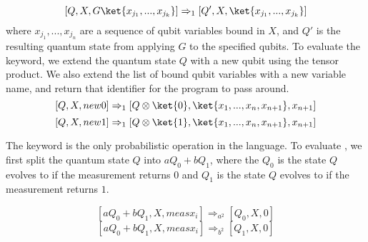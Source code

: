 \[ 
    [Q,X, G \ket{x_{j_1},...,x_{j_k}}] \Rightarrow_{1} [Q',X, \ket{x_{j_1},...,x_{j_k}}]
\]
where $x_{j_1},...,x_{j_n}$ are a sequence of qubit variables bound in $X$, and $Q'$ is the resulting quantum state from applying $G$ to the specified qubits.
To evaluate the  keyword, we extend the quantum state $Q$ with a new qubit using the tensor product.
We also extend the list of bound qubit variables with a new variable name, and return that identifier for the program to pass around.
\[
    [Q,X, new 0] \Rightarrow_1 [Q \otimes \ket{0}, \ket{x_1,...,x_n,x_{n+1}}, x_{n+1}]    
\]
\[
    [Q,X, new 1] \Rightarrow_1 [Q \otimes \ket{1}, \ket{x_1,...,x_n,x_{n+1}}, x_{n+1}]    
\]

The  keyword is the only probabilistic operation in the language.
To evaluate , we first split the quantum state $Q$ into $aQ_0 + bQ_1$, where the $Q_0$ is the state $Q$ evolves to if the measurement returns $0$ and $Q_1$ is the state $Q$ evolves to if the measurement returns $1$.

\[
    [aQ_0+bQ_1, X, meas x_i] \Rightarrow_{a^2} [Q_0,X,0]
\]
\[
    [aQ_0+bQ_1, X, meas x_i] \Rightarrow_{b^2} [Q_1,X,0]
\]
